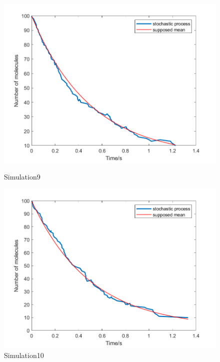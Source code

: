 \documentclass{article}
\begin{document}
\begin{figure}[htbp]
    \centering
    \begin{minipage}{0.45\linewidth}
        \centering
        \includegraphics[width=\linewidth]{graph/c9.png}
        \caption{Simulation9}
        \label{c9}
    \end{minipage}
    \hfill
    \begin{minipage}{0.45\linewidth}
        \centering
        \includegraphics[width=\linewidth]{graph/c10.png}
        \caption{Simulation10}
        \label{c10}
    \end{minipage}
\end{figure}
\end{document}
